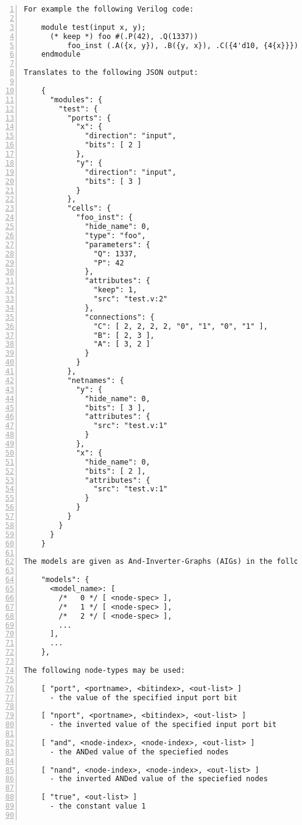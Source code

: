 \begin{lstlisting}[numbers=left,frame=single]
For example the following Verilog code:

    module test(input x, y);
      (* keep *) foo #(.P(42), .Q(1337))
          foo_inst (.A({x, y}), .B({y, x}), .C({4'd10, {4{x}}}));
    endmodule

Translates to the following JSON output:

    {
      "modules": {
        "test": {
          "ports": {
            "x": {
              "direction": "input",
              "bits": [ 2 ]
            },
            "y": {
              "direction": "input",
              "bits": [ 3 ]
            }
          },
          "cells": {
            "foo_inst": {
              "hide_name": 0,
              "type": "foo",
              "parameters": {
                "Q": 1337,
                "P": 42
              },
              "attributes": {
                "keep": 1,
                "src": "test.v:2"
              },
              "connections": {
                "C": [ 2, 2, 2, 2, "0", "1", "0", "1" ],
                "B": [ 2, 3 ],
                "A": [ 3, 2 ]
              }
            }
          },
          "netnames": {
            "y": {
              "hide_name": 0,
              "bits": [ 3 ],
              "attributes": {
                "src": "test.v:1"
              }
            },
            "x": {
              "hide_name": 0,
              "bits": [ 2 ],
              "attributes": {
                "src": "test.v:1"
              }
            }
          }
        }
      }
    }

The models are given as And-Inverter-Graphs (AIGs) in the following form:

    "models": {
      <model_name>: [
        /*   0 */ [ <node-spec> ],
        /*   1 */ [ <node-spec> ],
        /*   2 */ [ <node-spec> ],
        ...
      ],
      ...
    },

The following node-types may be used:

    [ "port", <portname>, <bitindex>, <out-list> ]
      - the value of the specified input port bit

    [ "nport", <portname>, <bitindex>, <out-list> ]
      - the inverted value of the specified input port bit

    [ "and", <node-index>, <node-index>, <out-list> ]
      - the ANDed value of the speciefied nodes

    [ "nand", <node-index>, <node-index>, <out-list> ]
      - the inverted ANDed value of the speciefied nodes

    [ "true", <out-list> ]
      - the constant value 1


\end{lstlisting}
